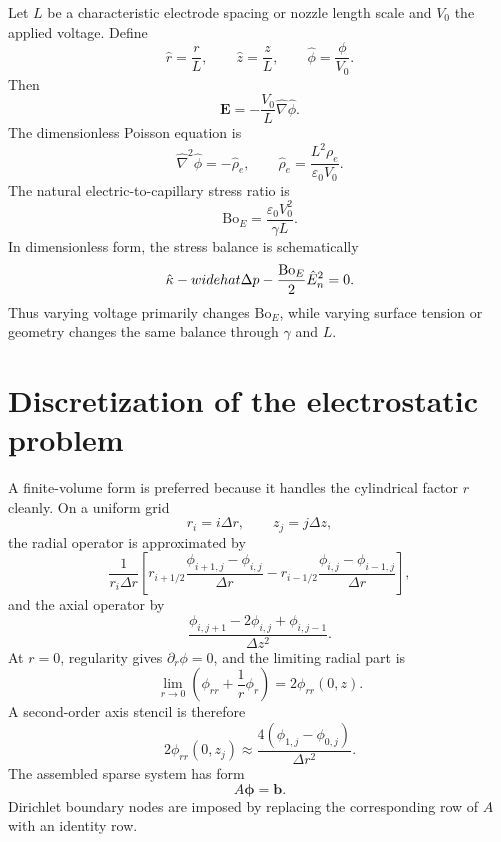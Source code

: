 \documentclass[11pt]{article}
\newcommand{\eps}{\varepsilon}
\newcommand{\vE}{\mathbf{E}}
\newcommand{\grad}{\nabla}
\newcommand{\BoE}{\mathrm{Bo}_E}
\begin{document}
Let \(L\) be a characteristic electrode spacing or nozzle length scale and \(V_0\) the applied voltage. Define
\begin{equation}
    \hat r=\frac{r}{L},\qquad
    \hat z=\frac{z}{L},\qquad
    \hat\phi=\frac{\phi}{V_0}.
\end{equation}
Then
\begin{equation}
    \vE=-\frac{V_0}{L}\hat\grad\hat\phi.
\end{equation}
The dimensionless Poisson equation is
\begin{equation}
    \hat\nabla^2\hat\phi=-\hat\rho_e,
    \qquad
    \hat\rho_e=\frac{L^2\rho_e}{\eps_0V_0}.
\end{equation}
The natural electric-to-capillary stress ratio is
\begin{equation}
    \BoE=\frac{\eps_0V_0^2}{\gamma L}.
    \label{eq:electric_bond}
\end{equation}
In dimensionless form, the stress balance is schematically
\begin{equation}
    \hat\kappa-\\widehat{\Delta p}-\frac{\BoE}{2}\hat E_n^2=0.
\end{equation}
Thus varying voltage primarily changes \(\BoE\), while varying surface tension or geometry changes the same balance through \(\gamma\) and \(L\).

\section{Discretization of the electrostatic problem}

A finite-volume form is preferred because it handles the cylindrical factor \(r\) cleanly. On a uniform grid
\begin{equation}
    r_i=i\Delta r,
    \qquad
    z_j=j\Delta z,
\end{equation}
the radial operator is approximated by
\begin{equation}
    \frac{1}{r_i\Delta r}
    \left[
    r_{i+1/2}\frac{\phi_{i+1,j}-\phi_{i,j}}{\Delta r}
    -
    r_{i-1/2}\frac{\phi_{i,j}-\phi_{i-1,j}}{\Delta r}
    \right],
\end{equation}
and the axial operator by
\begin{equation}
    \frac{\phi_{i,j+1}-2\phi_{i,j}+\phi_{i,j-1}}{\Delta z^2}.
\end{equation}
At \(r=0\), regularity gives \(\partial_r\phi=0\), and the limiting radial part is
\begin{equation}
    \lim_{r\to0}\left(\phi_{rr}+\frac{1}{r}\phi_r\right)=2\phi_{rr}(0,z).
\end{equation}
A second-order axis stencil is therefore
\begin{equation}
    2\phi_{rr}(0,z_j)\approx \frac{4(\phi_{1,j}-\phi_{0,j})}{\Delta r^2}.
\end{equation}
The assembled sparse system has form
\begin{equation}
    A\bm{\phi}=\bm b.
\end{equation}
Dirichlet boundary nodes are imposed by replacing the corresponding row of \(A\) with an identity row.
\end{document}
